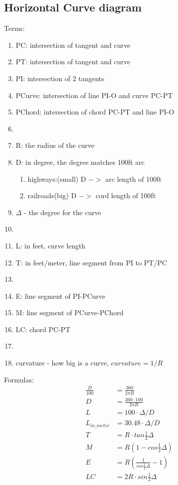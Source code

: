 \documentclass{article}
\begin{document}
  \subsection{Horizontal Curve diagram}
  Terms:
  \begin{enumerate}
    \item PC: intersection of tangent and curve
    \item PT: intersection of tangent and curve
    \item PI: intersection of 2 tangents
    \item PCurve: intersection of line PI-O and curve PC-PT
    \item PChord: intersection of chord PC-PT and line PI-O
    \item 
    \item R: the radius of the curve
    \item D: in degree, the degree matches 100ft arc
    \begin{enumerate}
      \item highways:(small) D $->$ arc length of 100ft
      \item railroads(big) D $->$ cord length of 100ft
    \end{enumerate}

    \item $\Delta$ - the degree for the curve
    \item 
    \item L: in feet, curve length 
    \item T: in feet/meter, line segment from PI to PT/PC
    \item 
    \item E: line segment of PI-PCurve
    \item M: line segment of PCurve-PChord 
    \item LC: chord PC-PT 
    \item 
    \item curvature - how big is a curve, $curvature = 1/R$
  \end{enumerate}
  Formulas:
  \begin{align*}
     \frac{D}{100} & = \frac{360}{2\pi R} \\
     D & = \frac{360 \cdot 100}{2\pi R} \\
     L & = 100 \cdot \Delta / D \\
     L_{in\_meter} & = 30.48 \cdot \Delta / D \\
     T & = R \cdot tan \frac{1}{2}\Delta \\
     M & = R(1-cos \frac{1}{2} \Delta) \\
     E & = R(\frac{1}{cos \frac{1}{2} \Delta} - 1) \\
     LC & = 2R \cdot sin \frac{1}{2} \Delta \\
  \end{align*}
\end{document}
